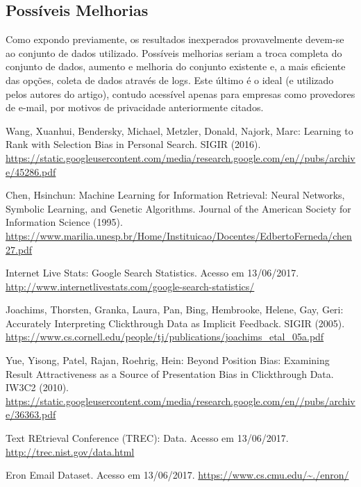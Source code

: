 \documentclass{svproc}
\begin{document}
\subsection{Possíveis Melhorias}
Como expondo previamente, os resultados inexperados provavelmente devem-se ao conjunto de dados utilizado. Possíveis melhorias
seriam a troca completa do conjunto de dados, aumento e melhoria do conjunto existente e, a mais eficiente das opções, coleta
de dados através de logs. Este último é o ideal (e utilizado pelos autores do artigo), contudo acessível apenas para empresas
como provedores de e-mail, por motivos de privacidade anteriormente citados.

\newpage

\begin{thebibliography}{6}

Wang, Xuanhui, Bendersky, Michael, Metzler, Donald, Najork, Marc: Learning to Rank with Selection Bias in Personal Search.
SIGIR (2016). \url{https://static.googleusercontent.com/media/research.google.com/en//pubs/archive/45286.pdf}

Chen, Hsinchun: Machine Learning for Information Retrieval: Neural Networks, Symbolic Learning, and Genetic Algorithms.
Journal of the American Society for Information Science (1995). \url{https://www.marilia.unesp.br/Home/Instituicao/Docentes/EdbertoFerneda/chen27.pdf}

Internet Live Stats: Google Search Statistics.
Acesso em 13/06/2017. \url{http://www.internetlivestats.com/google-search-statistics/}

Joachims, Thorsten, Granka, Laura, Pan, Bing, Hembrooke, Helene, Gay, Geri: Accurately Interpreting Clickthrough Data as Implicit
Feedback.
SIGIR (2005). \url{https://www.cs.cornell.edu/people/tj/publications/joachims_etal_05a.pdf}

Yue, Yisong, Patel, Rajan, Roehrig, Hein: Beyond Position Bias: Examining Result Attractiveness as
a Source of Presentation Bias in Clickthrough Data.
IW3C2 (2010). \url{https://static.googleusercontent.com/media/research.google.com/en//pubs/archive/36363.pdf}

Text REtrieval Conference (TREC): Data.
Acesso em 13/06/2017. \url{http://trec.nist.gov/data.html}

Eron Email Dataset.
Acesso em 13/06/2017. \url{https://www.cs.cmu.edu/~./enron/}

\end{thebibliography}
\end{document}
